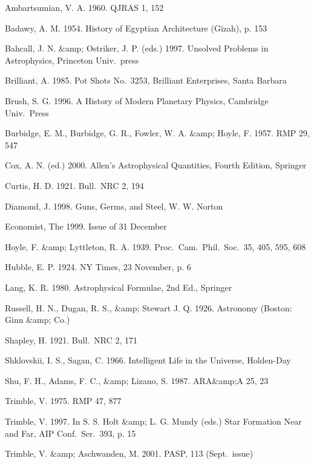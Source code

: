 {{{{{{{{{{{{{{%
Ambartsumian, V. A. 1960. QJRAS 1, 152

Badawy, A. M. 1954. History of Egyptian Architecture (Gizah), p. 153

Bahcall, J. N. &amp; Ostriker, J. P. (eds.) 1997. Unsolved Problems in
Astrophysics, Princeton Univ.\ press

Brilliant, A. 1985. Pot Shots No.\ 3253, Brilliant Enterprises,
Santa Barbara

Brush, S. G. 1996. A History of Modern Planetary Physics, Cambridge
Univ.\ Press

Burbidge, E. M., Burbidge, G. R., Fowler, W. A. &amp; Hoyle, F. 1957.
RMP 29, 547

Cox, A. N. (ed.) 2000. Allen's Astrophysical Quantities, Fourth
Edition, Springer

Curtis, H. D. 1921. Bull.\ NRC 2, 194

Diamond, J. 1998. Guns, Germs, and Steel, W. W. Norton

Economist, The 1999. Issue of 31 December

Hoyle, F. &amp; Lyttleton, R. A. 1939. Proc.\ Cam.\ Phil.\ Soc.\ 35, 405,
595, 608

Hubble, E. P. 1924. NY Times, 23 November, p. 6

Lang, K. R. 1980. Astrophysical Formulae, 2nd Ed., Springer

Russell, H. N., Dugan, R. S., &amp; Stewart J. Q. 1926. Astronomy (Boston:
Ginn &amp; Co.)

Shapley, H. 1921. Bull.\ NRC 2, 171

Shklovskii, I. S., Sagan, C. 1966. Intelligent Life in the Universe,
Holden-Day

Shu, F. H., Adams, F. C., &amp; Lizano, S. 1987. ARA&amp;A 25, 23

Trimble, V. 1975. RMP 47, 877

Trimble, V. 1997. In S. S. Holt &amp; L. G. Mundy (eds.) Star Formation
Near and Far, AIP Conf.\ Ser.\ 393, p. 15

Trimble, V. &amp; Aschwanden, M. 2001. PASP, 113 (Sept.\ issue)

}}}}}}}}}}}}}}
